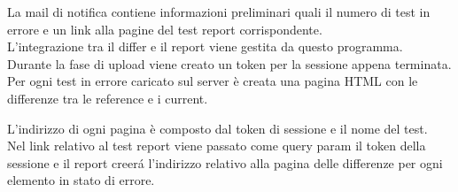         La mail di notifica contiene informazioni preliminari quali il numero di test in errore e un link alla pagine del test report corrispondente.\\

        L'integrazione tra il differ e il report viene gestita da questo programma.\\
        Durante la fase di upload viene creato un token per la sessione appena terminata.\\
        Per ogni test in errore caricato sul server è creata una pagina HTML con le differenze tra le reference e i current.
        
        L'indirizzo di ogni pagina è composto dal token di sessione e il nome del test.\\
        Nel link relativo al test report viene passato come query param il token della sessione e il report creer\'a l'indirizzo relativo alla pagina delle differenze per ogni elemento in stato di errore.
